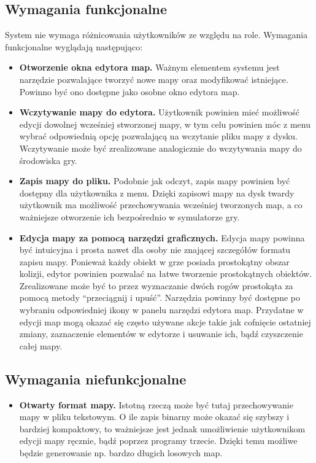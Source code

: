 \subsection{Wymagania funkcjonalne}
	System nie wymaga różnicowania użytkowników ze względu na role. Wymagania funkcjonalne wyglądają następująco:
	\begin{itemize}
		
		\item {\bf Otworzenie okna edytora map. }
		\newline
		Ważnym elementem systemu jest narzędzie pozwalające tworzyć nowe mapy oraz modyfikować istniejące.
		Powinno być ono dostępne jako osobne okno edytora map.
		\item {\bf Wczytywanie mapy do edytora. }
		\newline
		Użytkownik powinien mieć możliwość edycji dowolnej wcześniej stworzonej mapy, w tym celu powinien móc z menu wybrać odpowiednią opcję pozwalającą na wczytanie pliku mapy z dysku.
		Wczytywanie może być zrealizowane analogicznie do wczytywania mapy do środowiska gry.
		\item {\bf Zapis mapy do pliku. }
		\newline
		Podobnie jak odczyt, zapis mapy powinien być dostępny dla użytkownika z menu. 
		Dzięki zapisowi mapy na dysk twardy użytkownik ma możliwość przechowywania wcześniej tworzonych map, a co ważniejsze otworzenie ich bezpośrednio w symulatorze gry.
		\item {\bf Edycja mapy za pomocą narzędzi graficznych.}
		\newline
		Edycja mapy powinna być intuicyjna i prosta nawet dla osoby nie znającej szczegółów formatu zapisu mapy. 
		Ponieważ każdy obiekt w grze posiada prostokątny obszar kolizji, edytor powinien pozwalać na łatwe tworzenie prostokątnych obiektów.
		Zrealizowane może być to przez wyznaczanie dwóch rogów prostokąta za pomocą metody ``przeciągnij i upuść''.
		Narzędzia powinny być dostępne po wybraniu odpowiedniej ikony w panelu narzędzi edytora map.
		Przydatne w edycji map mogą okazać się często używane akcje takie jak cofnięcie ostatniej zmiany, zaznaczenie elementów w edytorze i usuwanie ich, bądź czyszczenie całej mapy.
	\end{itemize}
\subsection{Wymagania niefunkcjonalne}
	\begin{itemize}
	\item {\bf Otwarty format mapy. }	
	\newline
	Istotną rzeczą może być tutaj przechowywanie mapy w pliku tekstowym. 
	O ile zapis binarny może okazać się szybszy i bardziej kompaktowy, to ważniejsze jest jednak
	umożliwienie użytkownikom edycji mapy ręcznie, bądź poprzez programy trzecie. Dzięki temu możliwe będzie generowanie np. bardzo długich losowych map.
	\end{itemize}


